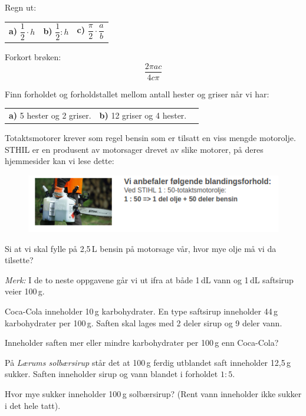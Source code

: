Regn ut:\os
\begin{tabular}{@{}l l l}
	\textbf{a)}	$ \dfrac{1}{2}\cdot h $
	& \textbf{b)} $ \dfrac{1}{2}: h  $ 
	& \textbf{c)} $ \dfrac{\pi}{2}\cdot\dfrac{a}{b} $
\end{tabular}

Forkort brøken:
\[ \frac{2\pi a c}{4c\pi} \]

\nes
{}
Finn forholdet og forholdstallet mellom antall hester og griser når vi har:\os
\begin{tabular}{@{}l l l}	
	\textbf{a)} 5 hester og 2 griser. &\textbf{b)} 12 griser og 4 hester.
\end{tabular}

Totaktsmotorer krever som regel bensin som er tilsatt en viss mengde motorolje. STHIL er en produsent av motorsager drevet av slike motorer, på deres hjemmesider kan vi lese dette:
\begin{figure}
	\includegraphics[]{stihl}
\end{figure}
Si at vi skal fylle på 2,5\,L bensin på motorsage vår, hvor mye olje må vi da tilsette?

\vsk \vspace{12pt}

\textsl{Merk:} I de to neste oppgavene går vi ut ifra at både 1\,dL vann og 1\,dL saftsirup veier 100\,g.

Coca-Cola inneholder 10\,g karbohydrater. En type saftsirup inneholder 44\,g karbohydrater per 100\,g. Saften skal lages med 2 deler sirup og 9 deler vann. \os

Inneholder saften mer eller mindre karbohydrater per 100\,g enn Coca-Cola?

På \textsl{Lærums solbærsirup} står det at 100\,g ferdig utblandet saft inneholder 12,5\,g sukker. Saften inneholder sirup og vann blandet i forholdet $ {1:5} $. \os

Hvor mye sukker inneholder 100\,g solbærsirup? (Rent vann inneholder ikke sukker i det hele tatt).


